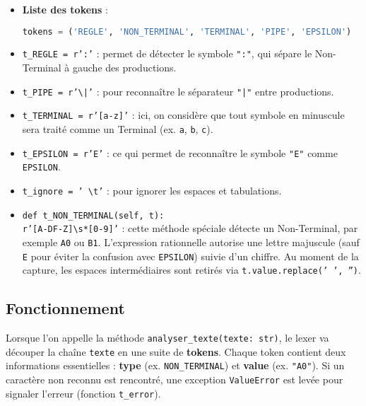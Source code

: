 \documentclass[a4paper,12pt]{article}
\begin{document}
\begin{itemize}
    \item \textbf{Liste des tokens} : 

\begin{lstlisting}[language=python, caption={Extrait du code pour la liste des tokens}, label={lst:tokens}]
tokens = ('REGLE', 'NON_TERMINAL', 'TERMINAL', 'PIPE', 'EPSILON')
\end{lstlisting}

    \item \texttt{t\_REGLE = r':'} : permet de détecter le symbole \texttt{":"}, 
    qui sépare le Non-Terminal à gauche des productions.

    \item \texttt{t\_PIPE = r'\textbackslash{}|'} : 
    pour reconnaître le séparateur \texttt{"|"} entre productions.

    \item \texttt{t\_TERMINAL = r'[a-z]'} : 
    ici, on considère que tout symbole en minuscule sera traité comme un Terminal 
    (ex. \texttt{a}, \texttt{b}, \texttt{c}).

    \item \texttt{t\_EPSILON = r'E'} : 
    ce qui permet de reconnaître le symbole \texttt{"E"} comme \texttt{EPSILON}.

    \item \texttt{t\_ignore = ' \textbackslash{}t'} : 
    pour ignorer les espaces et tabulations.

    \item \texttt{def t\_NON\_TERMINAL(self, t):\\
\quad\quad r'[A-DF-Z]\textbackslash{}s*[0-9]'} : 
    cette méthode spéciale détecte un Non-Terminal, par exemple \texttt{A0} ou \texttt{B1}. 
    L’expression rationnelle autorise une lettre majuscule (sauf \texttt{E} pour éviter la confusion 
    avec \texttt{EPSILON}) suivie d’un chiffre. 
    Au moment de la capture, les espaces intermédiaires sont retirés via 
    \texttt{t.value.replace(' ', '')}.
\end{itemize}

\subsection{Fonctionnement}
\label{subsec:fonctionnement-lexer}
Lorsque l’on appelle la méthode \texttt{analyser\_texte(texte: str)}, le lexer va découper la chaîne 
\texttt{texte} en une suite de \textbf{tokens}. Chaque token contient deux informations essentielles : 
\textbf{type} (ex. \texttt{NON\_TERMINAL}) et \textbf{value} (ex. \texttt{"A0"}). 
Si un caractère non reconnu est rencontré, une exception \texttt{ValueError} est levée pour signaler 
l’erreur (fonction \texttt{t\_error}).
\end{document}
